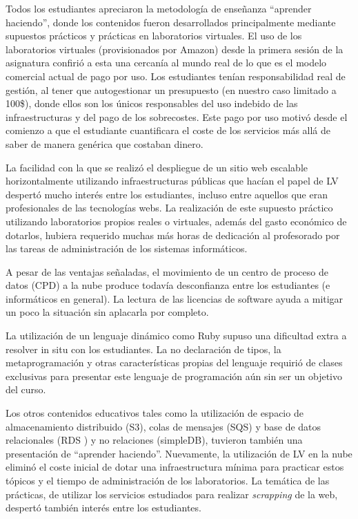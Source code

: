 \documentclass[conference]{IEEEtran}
\begin{document}
Todos los estudiantes apreciaron la metodología de enseñanza ``aprender
haciendo'', donde los contenidos fueron desarrollados principalmente mediante
supuestos prácticos y prácticas en laboratorios virtuales. El uso de los
laboratorios virtuales (provisionados por Amazon) desde la primera sesión de la
asignatura confirió a esta una cercanía al mundo real de lo que es el modelo comercial actual de pago por
uso. Los estudiantes tenían responsabilidad real de
gestión,  al tener que  autogestionar un presupuesto (en nuestro caso limitado a
100\$), donde ellos son los únicos responsables del uso indebido de las
infraestructuras y del pago de los sobrecostes. Este pago por uso motivó desde
el comienzo a que el estudiante cuantificara el coste de los servicios más allá
de saber de manera genérica que costaban dinero. 

La facilidad con la que se realizó el despliegue de un sitio web escalable
horizontalmente utilizando infraestructuras públicas que hacían el papel de LV
despertó mucho interés entre los estudiantes, incluso entre aquellos que eran
profesionales de las tecnologías webs. La realización de este supuesto práctico
utilizando laboratorios propios reales o virtuales, además del gasto
económico de dotarlos, hubiera requerido muchas más horas de
dedicación al profesorado  por las tareas  de administración de los sistemas
informáticos.

A pesar de las ventajas señaladas, el movimiento de un centro de proceso de datos (CPD) a la nube produce todavía desconfianza entre los estudiantes (e informáticos en general).
La lectura de las licencias de software ayuda a mitigar un poco la situación sin aplacarla por completo.

La utilización de un lenguaje dinámico como Ruby supuso una dificultad extra a
resolver in situ con los estudiantes. La no declaración de tipos, la
metaprogramación y otras características propias del lenguaje requirió de
clases exclusivas para presentar este lenguaje de programación aún sin ser un
objetivo del curso. 

Los otros contenidos educativos tales como la utilización de espacio de
almacenamiento distribuido (S3), colas de mensajes (SQS) y  base de datos
relacionales (RDS ) y no relaciones (simpleDB), tuvieron también una presentación
de ``aprender haciendo''. Nuevamente, la utilización de LV en la nube eliminó el
coste inicial de dotar una infraestructura mínima para practicar estos tópicos
y el tiempo de administración de los  laboratorios. La temática de las
prácticas, de utilizar los servicios estudiados  para
realizar \textit{scrapping} de la web, despertó también interés entre los
estudiantes.
\end{document}
